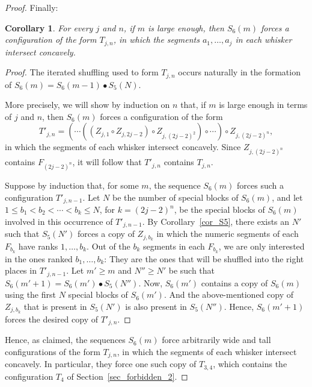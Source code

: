 \documentclass[11pt]{article}
\newtheorem{corollary}[theorem]{Corollary}
\theoremstyle{definition}
\theoremstyle{remark}
\begin{document}
\begin{proof}
Finally:

\begin{corollary}\label{cor_S6}
For every $j$ and $n$, if $m$ is large enough, then $S_6(m)$ forces a configuration of the form $T_{j,n}$, in which the segments $a_1, \ldots, a_j$ in each whisker intersect concavely.
\end{corollary}

\begin{proof}
The iterated shuffling used to form $T_{j,n}$ occurs naturally in the formation of $S_6(m) = S_6(m-1) \bullet S_5(N)$.

More precisely, we will show by induction on $n$ that, if $m$ is large enough in terms of $j$ and $n$, then $S_6(m)$ forces a configuration of the form
\begin{equation*}
T'_{j,n} = ( \cdots ((Z_{j,1} \circ Z_{j,2j-2}) \circ Z_{j,(2j-2)^2}) \circ \cdots )\circ Z_{j,(2j-2)^n},
\end{equation*}
in which the segments of each whisker intersect concavely. Since $Z_{j,(2j-2)^n}$ contains $F_{(2j-2)^n}$, it will follow that $T'_{j,n}$ contains $T_{j,n}$.

Suppose by induction that, for some $m$, the sequence $S_6(m)$ forces such a configuration $T'_{j,n-1}$. Let $N$ be the number of special blocks of $S_6(m)$, and let $1\le b_1 < b_2 < \cdots < b_k\le N$, for $k=(2j-2)^n$, be the special blocks of $S_6(m)$ involved in this occurrence of $T'_{j,n-1}$. By Corollary~\ref{cor_S5}, there exists an $N'$ such that $S_5(N')$ forces a copy of $Z_{j,b_k}$ in which the numeric segments of each $F_{b_k}$ have ranks $1,\ldots, b_k$. Out of the $b_k$ segments in each $F_{b_k}$, we are only interested in the ones ranked $b_1, \ldots, b_k$: They are the ones that will be shuffled into the right places in $T'_{j,n-1}$. Let $m'\ge m$ and $N''\ge N'$ be such that $S_6(m'+1) = S_6(m')\bullet S_5(N'')$. Now, $S_6(m')$ contains a copy of $S_6(m)$ using the first $N$ special blocks of $S_6(m')$. And the above-mentioned copy of $Z_{j,b_k}$ that is present in $S_5(N')$ is also present in $S_5(N'')$. Hence, $S_6(m'+1)$ forces the desired copy of $T'_{j,n}$.
\end{proof}

Hence, as claimed, the sequences $S_6(m)$ force arbitrarily wide and tall configurations of the form $T_{j,n}$, in which the segments of each whisker intersect concavely. In particular, they force one such copy of $T_{3,4}$, which contains the configuration $T_4$ of Section~\ref{sec_forbidden_2}.


\end{proof}
\end{document}
